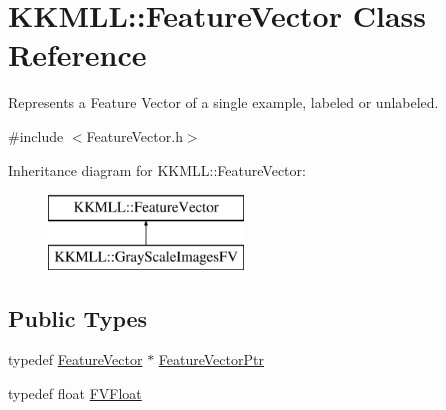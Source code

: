\hypertarget{class_k_k_m_l_l_1_1_feature_vector}{}\section{K\+K\+M\+LL\+:\+:Feature\+Vector Class Reference}
\label{class_k_k_m_l_l_1_1_feature_vector}


Represents a Feature Vector of a single example, labeled or unlabeled.  




{\ttfamily \#include $<$Feature\+Vector.\+h$>$}

Inheritance diagram for K\+K\+M\+LL\+:\+:Feature\+Vector\+:\begin{figure}[H]
\begin{center}
\leavevmode
\includegraphics[height=2.000000cm]{class_k_k_m_l_l_1_1_feature_vector}
\end{center}
\end{figure}
\subsection*{Public Types}
\begin{DoxyCompactItemize}
\item 
typedef \hyperlink{class_k_k_m_l_l_1_1_feature_vector}{Feature\+Vector} $\ast$ \hyperlink{class_k_k_m_l_l_1_1_feature_vector_a56571234d7b7fae4f6940ed9640aabf4}{Feature\+Vector\+Ptr}
\item 
typedef float \hyperlink{class_k_k_m_l_l_1_1_feature_vector_ae73c750043635f6dea8145b8a0d0b1e1}{F\+V\+Float}
\end{DoxyCompactItemize}
